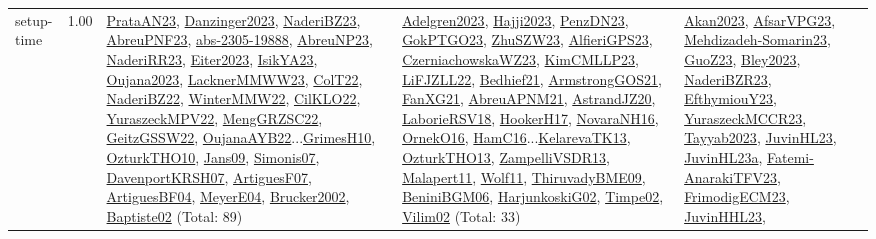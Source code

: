 {\begin{longtable}{p{3cm}r>{\raggedright\arraybackslash}p{6cm}>{\raggedright\arraybackslash}p{6cm}>{\raggedright\arraybackslash}p{8cm}}
\index{setup-time}\index{Concepts!setup-time}setup-time &  1.00 & \hyperref[detail:PrataAN23]{PrataAN23}, \hyperref[detail:Danzinger2023]{Danzinger2023}, \hyperref[detail:NaderiBZ23]{NaderiBZ23}, \hyperref[detail:AbreuPNF23]{AbreuPNF23}, \hyperref[detail:abs-2305-19888]{abs-2305-19888}, \hyperref[detail:AbreuNP23]{AbreuNP23}, \hyperref[detail:NaderiRR23]{NaderiRR23}, \hyperref[detail:Eiter2023]{Eiter2023}, \hyperref[detail:IsikYA23]{IsikYA23}, \hyperref[detail:Oujana2023]{Oujana2023}, \hyperref[detail:LacknerMMWW23]{LacknerMMWW23}, \hyperref[detail:ColT22]{ColT22}, \hyperref[detail:NaderiBZ22]{NaderiBZ22}, \hyperref[detail:WinterMMW22]{WinterMMW22}, \hyperref[detail:CilKLO22]{CilKLO22}, \hyperref[detail:YuraszeckMPV22]{YuraszeckMPV22}, \hyperref[detail:MengGRZSC22]{MengGRZSC22}, \hyperref[detail:GeitzGSSW22]{GeitzGSSW22}, \hyperref[detail:OujanaAYB22]{OujanaAYB22}...\hyperref[detail:GrimesH10]{GrimesH10}, \hyperref[detail:OzturkTHO10]{OzturkTHO10}, \hyperref[detail:Jans09]{Jans09}, \hyperref[detail:Simonis07]{Simonis07}, \hyperref[detail:DavenportKRSH07]{DavenportKRSH07}, \hyperref[detail:ArtiguesF07]{ArtiguesF07}, \hyperref[detail:ArtiguesBF04]{ArtiguesBF04}, \hyperref[detail:MeyerE04]{MeyerE04}, \hyperref[detail:Brucker2002]{Brucker2002}, \hyperref[detail:Baptiste02]{Baptiste02} (Total: 89) & \hyperref[detail:Adelgren2023]{Adelgren2023}, \hyperref[detail:Hajji2023]{Hajji2023}, \hyperref[detail:PenzDN23]{PenzDN23}, \hyperref[detail:GokPTGO23]{GokPTGO23}, \hyperref[detail:ZhuSZW23]{ZhuSZW23}, \hyperref[detail:AlfieriGPS23]{AlfieriGPS23}, \hyperref[detail:CzerniachowskaWZ23]{CzerniachowskaWZ23}, \hyperref[detail:KimCMLLP23]{KimCMLLP23}, \hyperref[detail:LiFJZLL22]{LiFJZLL22}, \hyperref[detail:Bedhief21]{Bedhief21}, \hyperref[detail:ArmstrongGOS21]{ArmstrongGOS21}, \hyperref[detail:FanXG21]{FanXG21}, \hyperref[detail:AbreuAPNM21]{AbreuAPNM21}, \hyperref[detail:AstrandJZ20]{AstrandJZ20}, \hyperref[detail:LaborieRSV18]{LaborieRSV18}, \hyperref[detail:HookerH17]{HookerH17}, \hyperref[detail:NovaraNH16]{NovaraNH16}, \hyperref[detail:OrnekO16]{OrnekO16}, \hyperref[detail:HamC16]{HamC16}...\hyperref[detail:KelarevaTK13]{KelarevaTK13}, \hyperref[detail:OzturkTHO13]{OzturkTHO13}, \hyperref[detail:ZampelliVSDR13]{ZampelliVSDR13}, \hyperref[detail:Malapert11]{Malapert11}, \hyperref[detail:Wolf11]{Wolf11}, \hyperref[detail:ThiruvadyBME09]{ThiruvadyBME09}, \hyperref[detail:BeniniBGM06]{BeniniBGM06}, \hyperref[detail:HarjunkoskiG02]{HarjunkoskiG02}, \hyperref[detail:Timpe02]{Timpe02}, \hyperref[detail:Vilim02]{Vilim02} (Total: 33) & \hyperref[detail:Akan2023]{Akan2023}, \hyperref[detail:AfsarVPG23]{AfsarVPG23}, \hyperref[detail:Mehdizadeh-Somarin23]{Mehdizadeh-Somarin23}, \hyperref[detail:GuoZ23]{GuoZ23}, \hyperref[detail:Bley2023]{Bley2023}, \hyperref[detail:NaderiBZR23]{NaderiBZR23}, \hyperref[detail:EfthymiouY23]{EfthymiouY23}, \hyperref[detail:YuraszeckMCCR23]{YuraszeckMCCR23}, \hyperref[detail:Tayyab2023]{Tayyab2023}, \hyperref[detail:JuvinHL23]{JuvinHL23}, \hyperref[detail:JuvinHL23a]{JuvinHL23a}, \hyperref[detail:Fatemi-AnarakiTFV23]{Fatemi-AnarakiTFV23}, \hyperref[detail:FrimodigECM23]{FrimodigECM23}, \hyperref[detail:JuvinHHL23]{JuvinHHL23}, 
\end{longtable}}
